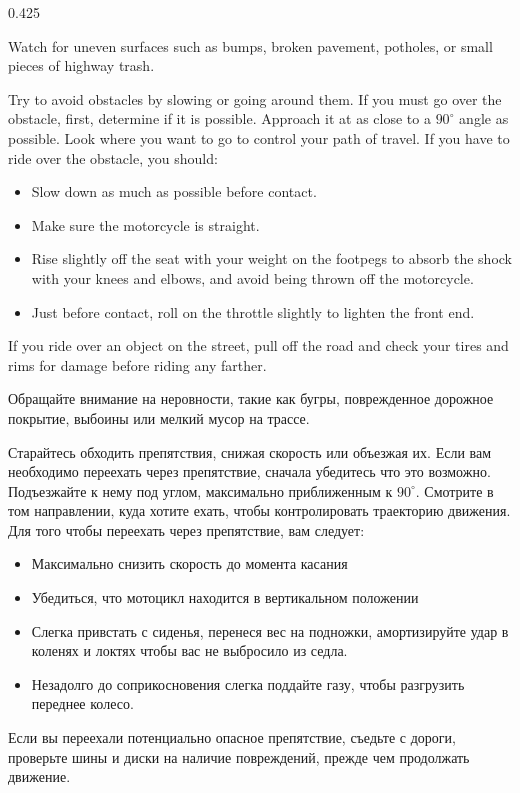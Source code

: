 \begin{langblock}{0.425}
	\begin{eng}
	
	Watch for uneven surfaces such as bumps, broken pavement, potholes, or small pieces of highway trash.
	
	Try to avoid obstacles by slowing or going around them. If you must go over the obstacle, first, determine if it is possible. Approach it at as close to a $90^{\circ}$ angle as possible. Look where you want to go to control your path of travel. If you have to ride over the obstacle, you should:
	
	\begin{itemize}[noitemsep]
		\item Slow down as much as possible before contact.
		\item Make sure the motorcycle is straight.
		\item Rise slightly off the seat with your weight on the footpegs to absorb the shock with your knees and elbows, and avoid being thrown off the motorcycle.
		\item Just before contact, roll on the throttle slightly to lighten the front end.
	\end{itemize}
	
	If you ride over an object on the street, pull off the road and check your tires and rims for damage before riding any farther.
	\end{eng}
	\begin{rus}
		
		Обращайте внимание на неровности, такие как бугры, поврежденное дорожное покрытие, выбоины или мелкий мусор на трассе.
		
		Старайтесь обходить препятствия, снижая скорость или объезжая их. Если вам необходимо переехать через препятствие, сначала убедитесь что это возможно. Подъезжайте к нему под углом, максимально приближенным к $90^{\circ}$. Смотрите в том направлении, куда хотите ехать, чтобы контролировать траекторию движения. Для того чтобы переехать через препятствие, вам следует:
		
		\begin{itemize}[noitemsep]
			\item Максимально снизить скорость до момента касания
			\item Убедиться, что мотоцикл находится в вертикальном положении
			\item Слегка привстать с сиденья, перенеся вес на подножки, амортизируйте удар в коленях и локтях чтобы вас не выбросило из седла.
			\item Незадолго до соприкосновения слегка поддайте газу, чтобы разгрузить переднее колесо.
		\end{itemize}
		
		Если вы переехали потенциально опасное препятствие, съедьте с дороги, проверьте шины и диски на наличие повреждений, прежде чем продолжать движение.
\end{rus}
\end{langblock}

